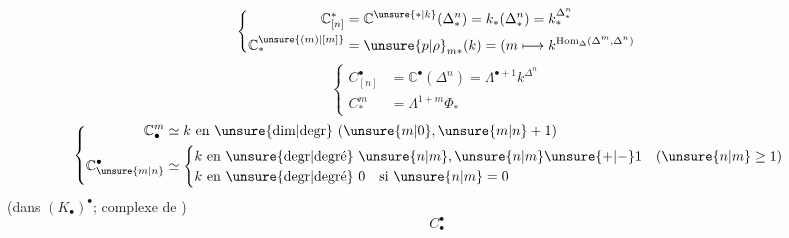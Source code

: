 

\[
\left\{\begin{aligned}
\mathbb C_{[n]}^*&=\mathbb C^{\unsure{*|k}}(\Delta_*^n)=k_*(\Delta_*^n)=k_*^{\Delta_*^n}\\
\mathbb C_*^{\unsure{(m)|[m]}}&=\unsure{p|\rho}_{m*}(k)=(m\longmapsto k^{\operatorname{Hom}_\Delta(\Delta^m,\Delta^n)}
\end{aligned}\right.
\]
\[
\left\{\begin{aligned}
C_{[n]}^\bullet&=\mathbb C^\bullet(\Delta^n)=\Lambda^{\bullet+1}k^{\Delta^n}\\
C_*^m&=\Lambda^{1+m}\Phi_*
\end{aligned}\right.
\]
\[
\left\{\begin{aligned}
\mathbb C_\bullet^m&\simeq k\ \text{en \unsure{dim|degr} }(\unsure{m|0},\unsure{m|n}+1)\\
\mathbb C_{\unsure{m|n}}^\bullet&\simeq
\begin{cases}k\ \text{en \unsure{degr|degré} }\unsure{n|m},\unsure{n|m}\unsure{+|-}1\quad(\unsure{n|m}\geq1)\\
k\ \text{en \unsure{degr|degré} }0\quad\text{si }\unsure{n|m}=0
\end{cases}
\end{aligned}\right.
\]
(dans $(K_\bullet)^\bullet$; complexe de )
\[
C_\bullet^\bullet
\]

